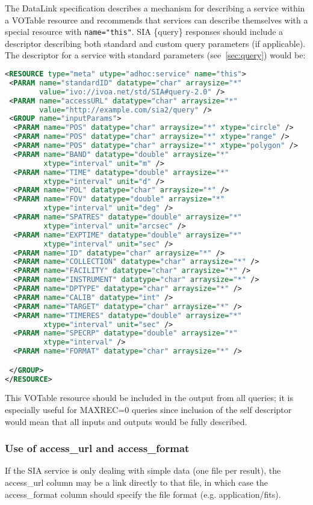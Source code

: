 \documentclass[11pt,a4paper]{ivoa}
\begin{document}
The DataLink specification describes a mechanism for describing a service within a VOTable resource and recommends that services can describe themselves with a special resource with \verb|name="this"|. SIA \{query\} responses should include a descriptor describing both standard and custom query parameters (if applicable). The descriptor for a service with standard parameters (see~\ref{sec:query}) would be:
\begin{lstlisting}[language=XML]
<RESOURCE type="meta" utype="adhoc:service" name="this">
 <PARAM name="standardID" datatype="char" arraysize="*"
        value="ivo://ivoa.net/std/SIA#query-2.0" />
 <PARAM name="accessURL" datatype="char" arraysize="*"
        value="http://example.com/sia2/query" />
 <GROUP name="inputParams">
  <PARAM name="POS" datatype="char" arraysize="*" xtype="circle" />
  <PARAM name="POS" datatype="char" arraysize="*" xtype="range" />
  <PARAM name="POS" datatype="char" arraysize="*" xtype="polygon" />
  <PARAM name="BAND" datatype="double" arraysize="*"
         xtype="interval" unit="m" />
  <PARAM name="TIME" datatype="double" arraysize="*"
         xtype="interval" unit="d" />
  <PARAM name="POL" datatype="char" arraysize="*" />
  <PARAM name="FOV" datatype="double" arraysize="*"
         xtype="interval" unit="deg" />
  <PARAM name="SPATRES" datatype="double" arraysize="*"
         xtype="interval" unit="arcsec" />
  <PARAM name="EXPTIME" datatype="double" arraysize="*"
         xtype="interval" unit="sec" />
  <PARAM name="ID" datatype="char" arraysize="*" />
  <PARAM name="COLLECTION" datatype="char" arraysize="*" />
  <PARAM name="FACILITY" datatype="char" arraysize="*" />
  <PARAM name="INSTRUMENT" datatype="char" arraysize="*" />
  <PARAM name="DPTYPE" datatype="char" arraysize="*" />
  <PARAM name="CALIB" datatype="int" />
  <PARAM name="TARGET" datatype="char" arraysize="*" />
  <PARAM name="TIMERES" datatype="double" arraysize="*"
         xtype="interval" unit="sec" />
  <PARAM name="SPECRP" datatype="double" arraysize="*"
         xtype="interval" />
  <PARAM name="FORMAT" datatype="char" arraysize="*" />

 </GROUP>
</RESOURCE>

\end{lstlisting}
This VOTable resource should be included in the output from all queries; it is especially useful for MAXREC=0 queries since inclusion of the self descriptor would mean that all inputs and outputs would be fully described.




\subsubsection{Use of access\_url and access\_format}
If the SIA service is only dealing with simple data (one file per result), the access\_url column may be a link directly to that file, in which case the access\_format column should specify the file format (e.g. application/fits).
\end{document}
